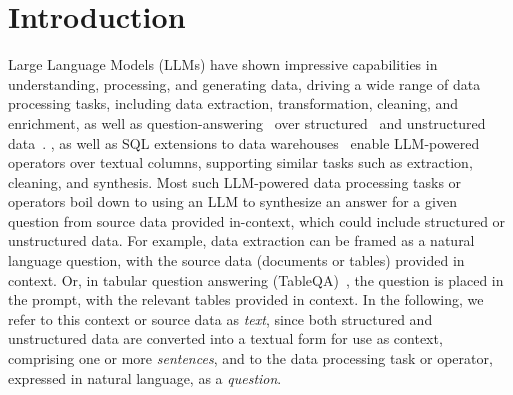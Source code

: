 \vspace{-2mm}
\section{Introduction}
\label{sec:introduction}
Large Language Models (LLMs) have shown impressive capabilities
in understanding, processing, and generating data, 
driving a wide range of data processing tasks, including data extraction, 
transformation, cleaning, and enrichment, as well as question-answering~\cite{zhao2024chat2data, huang2024transform, naeem2024retclean, buss2023generating, zhu2024autotqa} over structured~\cite{jin2022survey,nan2022fetaqa} and unstructured data~\cite{zhuang2023toolqa}. 
, 
as well as SQL extensions to
data warehouses~\cite{databricks-llm,snowflake-llm, duckdb-llm,alloydb-llm} 
enable LLM-powered operators over textual columns, 
supporting similar tasks such as extraction, cleaning, and synthesis.
Most such LLM-powered data processing tasks or operators 
boil down to using an LLM 
to synthesize an answer for a given question 
from source data provided in-context, 
which could include 
structured or unstructured data. 
For example, data extraction can be framed as 
a natural language question, with the source data (documents or tables) provided in context. Or,  
in tabular question answering (TableQA)~\cite{jin2022survey,nan2022fetaqa}, 
the question is placed in the prompt, with
the relevant tables provided in context. 
In the following,
we refer to this context or source data as {\em text}, 
since both structured and unstructured data are converted 
into a textual form for use as context, comprising
one or more {\em sentences},
and to the data processing task or operator, expressed in natural language, as a {\em question}. 



